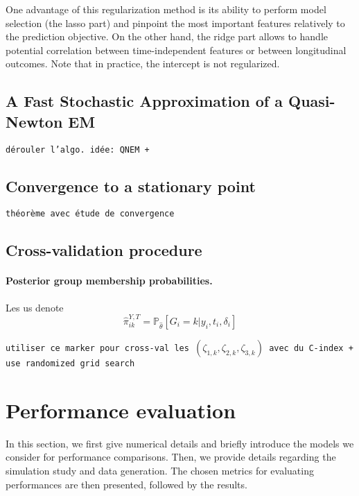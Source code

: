 \documentclass[11pt]{article}
\renewcommand{\P}{\mathds P}
\begin{document}
One advantage of this regularization method is its ability to perform model selection (the lasso part) and pinpoint the most important
features relatively to the prediction objective. On the other hand, the ridge part allows to handle potential correlation between time-independent features or between longitudinal outcomes. Note that in practice, the intercept is not regularized.

\subsection{A Fast Stochastic Approximation of a Quasi-Newton EM}
\label{sec:FSA-QNEM}

\texttt{dérouler l'algo. idée: QNEM + \citet{karimi2020f}}

\subsection{Convergence to a stationary point}
\label{sec:convergence}

\texttt{théorème avec étude de convergence}

\subsection{Cross-validation procedure}
\label{sec:CV-procedure}

\paragraph{Posterior group membership probabilities.}

Les us denote
\begin{equation}
	\hat \pi_{ik}^{Y,T} = \P_{\hat \theta}[G_i = k | y_i, t_i, \delta_i]
\end{equation}

\texttt{utiliser ce marker pour cross-val les $(\zeta_{1,k}, \zeta_{2,k}, \zeta_{3,k})$ avec du C-index + use randomized grid search~\citep{bergstra2012random}}


\section{Performance evaluation}
\label{sec:Performance evaluation}

In this section, we first give numerical details and briefly introduce the models we consider for performance comparisons. Then, we provide details regarding the simulation study and data generation. The chosen metrics for evaluating performances are then presented, followed by the results.
\end{document}
